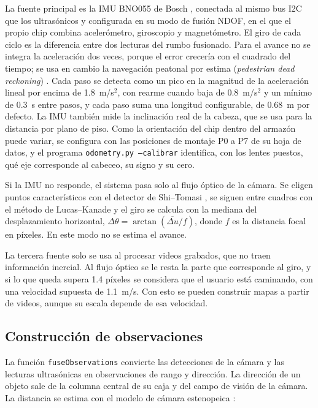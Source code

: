 La fuente principal es la IMU BNO055 de Bosch \cite{bno055_datasheet}, conectada al
mismo bus I2C que los ultrasónicos y configurada en su modo de fusión NDOF, en el que
el propio chip combina acelerómetro, giroscopio y magnetómetro. El giro de cada ciclo es
la diferencia entre dos lecturas del rumbo fusionado. Para el avance no se integra la
aceleración dos veces, porque el error crecería con el cuadrado del tiempo; se usa en
cambio la navegación peatonal por estima (\emph{pedestrian dead reckoning})
\cite{harle2013pdr}. Cada paso se detecta como un pico en la magnitud de la aceleración
lineal por encima de 1.8~m/s$^2$, con rearme cuando baja de 0.8~m/s$^2$ y un mínimo de
0.3~s entre pasos, y cada paso suma una longitud configurable, de 0.68~m por defecto. La
IMU también mide la inclinación real de la cabeza, que se usa para la distancia por
plano de piso. Como la orientación del chip dentro del armazón puede variar, se
configura con las posiciones de montaje P0 a P7 de su hoja de datos, y el programa
\texttt{odometry.py --calibrar} identifica, con los lentes puestos, qué eje corresponde
al cabeceo, su signo y su cero.

Si la IMU no responde, el sistema pasa solo al flujo óptico de la cámara. Se eligen
puntos característicos con el detector de Shi--Tomasi \cite{shi1994good}, se siguen
entre cuadros con el método de Lucas--Kanade \cite{lucas1981iterative} y el giro se
calcula con la mediana del desplazamiento horizontal, $\Delta\theta =
\arctan(\overline{\Delta u} / f)$, donde $f$ es la distancia focal en píxeles. En este
modo no se estima el avance.

La tercera fuente solo se usa al procesar videos grabados, que no traen información
inercial. Al flujo óptico se le resta la parte que corresponde al giro, y si lo que
queda supera 1.4 píxeles se considera que el usuario está caminando, con una velocidad
supuesta de 1.1~m/s. Con esto se pueden construir mapas a partir de videos, aunque su
escala depende de esa velocidad.

\subsection{Construcción de observaciones}

La función \texttt{fuseObservations} convierte las detecciones de la cámara y las
lecturas ultrasónicas en observaciones de rango y dirección. La dirección de un objeto
sale de la columna central de su caja y del campo de visión de la cámara. La distancia
se estima con el modelo de cámara estenopeica \cite{hartley2004multiple}:

